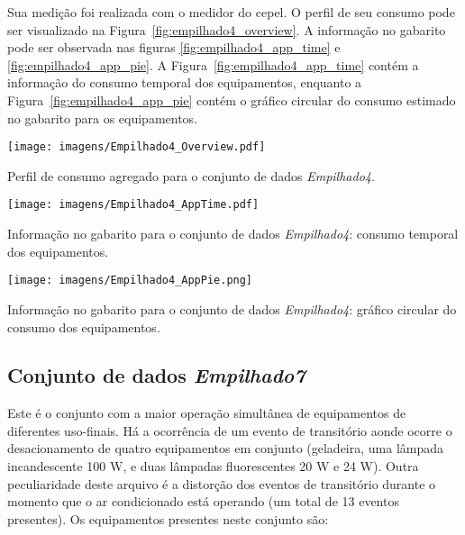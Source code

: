Sua medição foi realizada com o medidor do \acs{cepel}. O perfil de seu
consumo pode ser visualizado na Figura~\ref{fig:empilhado4_overview}.
A informação no gabarito pode ser observada nas figuras
\ref{fig:empilhado4_app_time} e \ref{fig:empilhado4_app_pie}.  A
Figura~\ref{fig:empilhado4_app_time} contém a informação do consumo
temporal dos equipamentos, enquanto a
Figura~\ref{fig:empilhado4_app_pie} contém o gráfico circular do
consumo estimado no gabarito para os equipamentos.

\begin{SidewaysFigure}
\centering
\texttt{[image: imagens/Empilhado4\_Overview.pdf]}
\caption{Perfil de consumo agregado para o conjunto de dados \emph{Empilhado4}.}
\label{fig:empilhado4_overview}
\end{SidewaysFigure}

\begin{SidewaysFigure}
\centering
\texttt{[image: imagens/Empilhado4\_AppTime.pdf]}
\caption{Informação no gabarito para o conjunto de dados
\emph{Empilhado4}: consumo temporal dos equipamentos.}
\label{fig:empilhado4_app_time}
\end{SidewaysFigure}

\begin{SidewaysFigure}
\centering
\texttt{[image: imagens/Empilhado4\_AppPie.png]}
\caption{Informação no gabarito para o conjunto de dados
\emph{Empilhado4}: gráfico circular do consumo dos equipamentos.}
\label{fig:empilhado4_app_pie}
\end{SidewaysFigure}

\FloatBarrier

\subsection{Conjunto de dados \emph{Empilhado7}}
\label{ssec:emp7}

Este é o conjunto com a maior operação simultânea de equipamentos de
diferentes uso-finais. Há a ocorrência de um evento de transitório
aonde ocorre o desacionamento de quatro equipamentos em conjunto
(geladeira, uma lâmpada incandescente 100 W, e duas lâmpadas
fluorescentes 20 W e 24 W). Outra peculiaridade deste arquivo é a
distorção dos eventos de transitório durante o momento que o ar
condicionado está operando (um total de 13 eventos presentes). Os
equipamentos presentes neste conjunto são:

